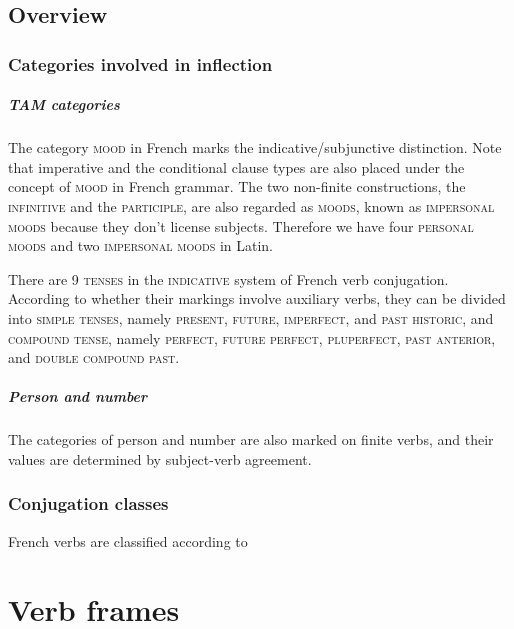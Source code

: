 \documentclass[a4paper, oneside, 12pt]{report}
\newcommand*{\category}[1]{\textsc{#1}}
\begin{document}
\section{Overview}

\subsection{Categories involved in inflection}\label{sec:verb-inflection.overview.categories}

\paragraph*{TAM categories}
The category \category{mood} in French marks the indicative/subjunctive distinction.
Note that imperative and the conditional clause types
are also placed under the concept of \category{mood} in French grammar.
The two non-finite constructions, the \category{infinitive} and the \category{participle},
are also regarded as \category{moods},
known as \category{impersonal moods} because they don't license subjects.
Therefore we have four \category{personal moods} and two \category{impersonal moods} in Latin.

There are 9 \category{tenses} in the \category{indicative} system of French verb conjugation.
According to whether their markings involve auxiliary verbs,
they can be divided into \category{simple tenses}, namely \category{present}, \category{future}, \category{imperfect}, and \category{past historic},
and \category{compound tense}, namely \category{perfect}, \category{future perfect}, \category{pluperfect}, \category{past anterior}, and \category{double compound past}.

\paragraph*{Person and number}
The categories of person and number are also marked on finite verbs,
and their values are determined by subject-verb agreement. 

\subsection{Conjugation classes}

French verbs are classified according to 

\chapter{Verb frames}
\end{document}
